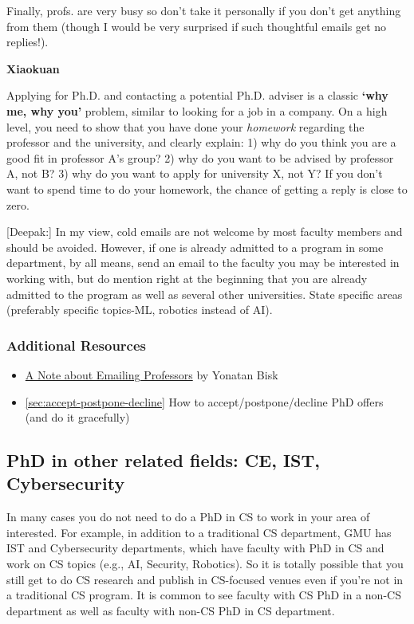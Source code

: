 \documentclass[oneside,11pt]{memoir}
\newenvironment{commentbox}[1][]{
  \small
  \begin{mybox}
    {\small \textbf{#1}}
  }{
  \end{mybox}
}
\begin{document}
Finally, profs. are very busy so don't take it personally if you don't get anything from them (though I would be very surprised if such thoughtful emails get no replies!). 


\begin{commentbox}[Xiaokuan]
  Applying for Ph.D. and contacting a potential Ph.D. adviser is a classic \textbf{`why me, why you'} problem,
  similar to looking for a job in a company.
  On a high level,
  you need to show that you have done your \emph{homework}
  regarding the professor and the university,
  and clearly explain:
  1) why do you think you are a good fit in professor A's group?
  2) why do you want to be advised by professor A, not B?
  3) why do you want to apply for university X, not Y?
  If you don't want to spend time to do your homework,
  the chance of getting a reply is close to zero.
\end{commentbox}


\begin{commentbox}
  [Deepak:]
  In my view, cold emails are not welcome by most faculty members and should be avoided. However, if one is already admitted to a program in some department, by all means, send an email to the faculty you may be interested in working with, but do mention right at the beginning that you are already admitted to the program as well as several other universities. State specific areas (preferably specific topics-ML, robotics instead of AI).
\end{commentbox}

\subsubsection*{Additional Resources}
\begin{itemize}
  \item \href{https://yonatanbisk.com/emailing_professors.html}{A Note about Emailing Professors} by Yonatan Bisk
  \item \autoref{sec:accept-postpone-decline} How to accept/postpone/decline PhD offers (and do it gracefully)
\end{itemize}

\subsection{PhD in other related fields: CE, IST, Cybersecurity}\label{sec:related-fields}

In many cases you do not need to do a PhD in CS to work in your area of interested. For example, in addition to a traditional CS department, GMU has IST and Cybersecurity departments, which have faculty  with PhD in CS and work on CS topics (e.g., AI, Security, Robotics).  So it is totally possible that you still get to do CS research and publish in CS-focused venues even if you're not in a traditional CS program.  It is  common to see faculty with CS PhD in a non-CS department as well as faculty with non-CS PhD in CS department.  
\end{document}

